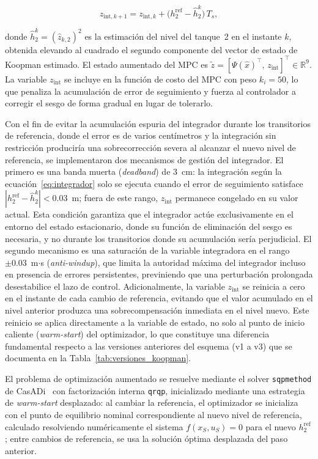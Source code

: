 \documentclass[12pt,letterpaper]{article}
\begin{document}
\begin{equation}
z_{\mathrm{int},k+1} = z_{\mathrm{int},k} + 
\bigl(h_2^{\mathrm{ref}} - \hat{h}_2^k\bigr)\,T_s,
\label{eq:integrador}
\end{equation}

donde $\hat{h}_2^k = (\hat{z}_{k,2})^2$ es la estimación del nivel del 
tanque~2 en el instante $k$, obtenida elevando al cuadrado el segundo 
componente del vector de estado de Koopman estimado. El estado aumentado 
del MPC es $\tilde{z} = [\Psi(\hat{x})^\top,\, z_{\mathrm{int}}]^\top 
\in \mathbb{R}^9$. La variable $z_{\mathrm{int}}$ se incluye en la 
función de costo del MPC con peso $k_i = 50$, lo que penaliza la 
acumulación de error de seguimiento y fuerza al controlador a corregir 
el sesgo de forma gradual en lugar de tolerarlo.

Con el fin de evitar la acumulación espuria del integrador durante los
transitorios de referencia, donde el error es de varios centímetros y
la integración sin restricción produciría una sobrecorrección severa al
alcanzar el nuevo nivel de referencia, se implementaron dos mecanismos
de gestión del integrador. El primero es una banda muerta (\textit{deadband}) 
de $3$~cm: la integración según la ecuación~\eqref{eq:integrador} solo se 
ejecuta cuando el error de seguimiento satisface $|h_2^{\mathrm{ref}} - 
\hat{h}_2^k| < 0.03$~m; fuera de este rango, $z_{\mathrm{int}}$ permanece 
congelado en su valor actual. Esta condición garantiza que el integrador 
actúe exclusivamente en el entorno del estado estacionario, donde su 
función de eliminación del sesgo es necesaria, y no durante los 
transitorios donde su acumulación sería perjudicial. El segundo mecanismo 
es una saturación de la variable integradora en el rango $\pm 0.03$~m$\cdot$s 
(\textit{anti-windup}), que limita la autoridad máxima del integrador 
incluso en presencia de errores persistentes, previniendo que una 
perturbación prolongada desestabilice el lazo de control. Adicionalmente, 
la variable $z_{\mathrm{int}}$ se reinicia a cero en el instante de cada 
cambio de referencia, evitando que el valor acumulado en el nivel anterior 
produzca una sobrecompensación inmediata en el nivel nuevo. Este reinicio
se aplica directamente a la variable de estado, no solo al punto de
inicio caliente (\textit{warm-start}) del optimizador, lo que
constituye una diferencia fundamental respecto a las versiones
anteriores del esquema (v1 a v3) que se documenta en la 
Tabla~\ref{tab:versiones_koopman}.

El problema de optimización aumentado se resuelve mediante el solver
\texttt{sqpmethod} de CasADi~\cite{andersson2019} con factorización
interna \texttt{qrqp}, inicializado mediante una estrategia de
\textit{warm-start} desplazado: al cambiar la referencia, el optimizador
se inicializa con el punto de equilibrio nominal correspondiente al nuevo
nivel de referencia, calculado resolviendo numéricamente el sistema
$f(x_S, u_S) = 0$ para el nuevo $h_2^{\mathrm{ref}}$; entre cambios de
referencia, se usa la solución óptima desplazada del paso anterior.
\end{document}

